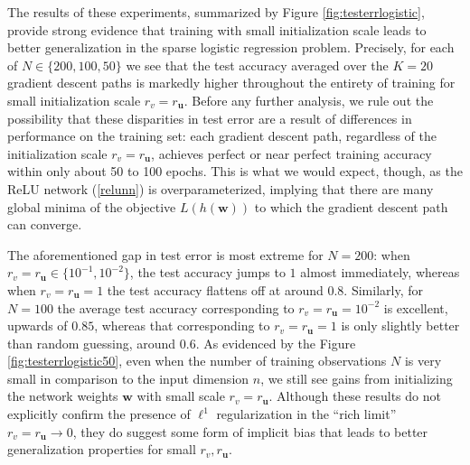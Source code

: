 \documentclass{article}
\begin{document}
The results of these experiments, summarized by Figure \ref{fig:testerrlogistic}, provide strong evidence that training with small initialization scale leads to better generalization in the sparse logistic regression problem. Precisely, for each of $N \in \{200, 100, 50\}$ we see that the test accuracy averaged over the $K=20$ gradient descent paths is markedly higher throughout the entirety of training for small initialization scale $r_v = r_{\boldsymbol{u}}$. Before any further analysis, we rule out the possibility that these disparities in test error are a result of differences in performance on the training set: each gradient descent path, regardless of the initialization scale $r_v = r_{\boldsymbol{u}}$, achieves perfect or near perfect training accuracy within only about 50 to 100 epochs. This is what we would expect, though, as the ReLU network (\ref{relunn}) is overparameterized, implying that there are many global minima of the objective $L(h(\boldsymbol{w}))$ to which the gradient descent path can converge. 

The aforementioned gap in test error is most extreme for $N = 200$: when $r_v = r_{\boldsymbol{u}} \in \{10^{-1}, 10^{-2} \}$, the test accuracy jumps to $1$ almost immediately, whereas when $r_v = r_{\boldsymbol{u}} = 1$ the test accuracy flattens off at around $0.8$. Similarly, for $N=100$ the average test accuracy corresponding to $r_v = r_{\boldsymbol{u}} = 10^{-2}$ is excellent, upwards of $0.85$, whereas that corresponding to $r_v = r_{\boldsymbol{u}} = 1$ is only slightly better than random guessing, around $0.6$. As evidenced by the Figure \ref{fig:testerrlogistic50}, even when the number of training observations $N$ is very small in comparison to the input dimension $n$, we still see gains from initializing the network weights $\boldsymbol{w}$ with small scale $r_v = r_{\boldsymbol{u}}$. Although these results do not explicitly confirm the presence of $\ell^1$ regularization in the \enquote{rich limit} $r_v = r_{\boldsymbol{u}} \rightarrow 0$, they do suggest some form of implicit bias that leads to better generalization properties for small $r_v, r_{\boldsymbol{u}}$.
\end{document}
